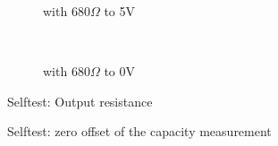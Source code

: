 \begin{figure}[H]
  \begin{subfigure}[b]{9cm}
  \centering
    \resizebox{9cm}{!}{}
    \caption{with \(680 \Omega\) to 5V}
    \label{fig:SelfTRoL}
  \end{subfigure}
  ~
  \begin{subfigure}[b]{9cm}
  \centering
    \resizebox{9cm}{!}{}
    \caption{with \(680 \Omega\) to 0V}
    \label{fig:SelfTRoH}
  \end{subfigure}
  \caption{Selftest: Output resistance}
\end{figure}

\begin{figure}[H]
\centering

\caption{Selftest: zero offset of the capacity measurement}
\label{fig:SelfTcap}
\end{figure}

